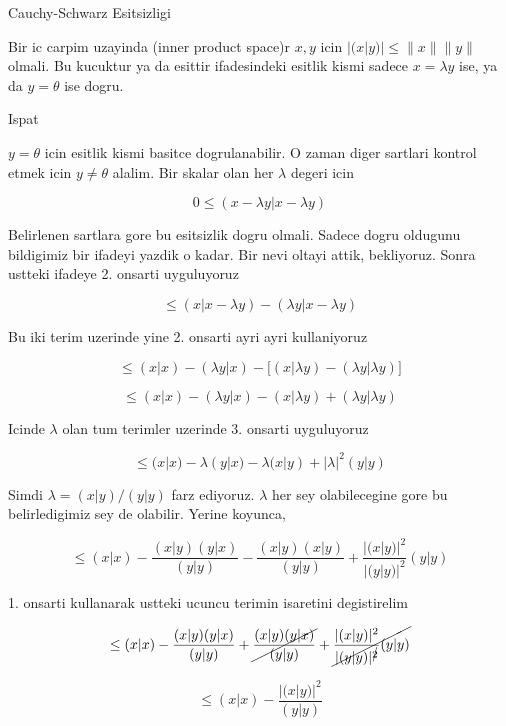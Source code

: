 \documentclass[12pt,fleqn]{article}\usepackage{../common}
\begin{document}
Cauchy-Schwarz Esitsizligi

Bir ic carpim uzayinda (inner product space)r $x,y$ icin $|(x|y)| \le
\|x\|\|y\|$ olmali. 
Bu kucuktur ya da esittir ifadesindeki esitlik kismi sadece $x = \lambda y$
ise, ya da $y = \theta$ ise dogru. 

Ispat

$y = \theta$ icin esitlik kismi basitce dogrulanabilir. O zaman diger
sartlari kontrol etmek icin $y \ne \theta$ alalim. Bir skalar olan her
$\lambda$ degeri icin 

\[ 
0 \le (x-\lambda y | x-\lambda y) 
 \]

Belirlenen sartlara gore bu esitsizlik dogru olmali. Sadece dogru oldugunu
bildigimiz bir ifadeyi yazdik o kadar. Bir nevi oltayi attik, bekliyoruz. 
Sonra ustteki ifadeye 2. onsarti uyguluyoruz

\[ \le (x|x-\lambda y) - (\lambda y| x - \lambda y)\]

Bu iki terim uzerinde yine 2. onsarti ayri ayri kullaniyoruz

\[ 
\le (x|x) - (\lambda y|x) - 
\bigg[ (x|\lambda y) - (\lambda y|\lambda y) \bigg] 
\]

\[ 
\le (x|x) - (\lambda y|x) -  (x|\lambda y) + (\lambda y|\lambda y) 
\]

Icinde $\lambda$ olan tum terimler uzerinde 3. onsarti uyguluyoruz

\[ 
\le
(x|x) - \lambda(y|x) -
\lambda(x|y) + |\lambda|^2 (y|y)
 \]

Simdi $\lambda  = (x|y)/(y|y)$ farz ediyoruz. $\lambda$ her sey olabilecegine gore bu 
belirledigimiz sey de olabilir. Yerine koyunca, 

\[ \le (x|x) - 
\frac{ (x|y)(y|x)}{(y|y)} - 
\frac{ (x|y)(x|y)}{(y|y)} + 
\frac{ |(x|y)|^2}{|(y|y)|^2}(y|y)
 \]

1. onsarti kullanarak ustteki ucuncu terimin isaretini degistirelim

\[ \le (x|x) - 
\frac{ (x|y)(y|x)}{(y|y)} +
\cancel{\frac{ (x|y)(y|x)}{(y|y)}} + 
\cancel{\frac{ |(x|y)|^2}{|(y|y)|^{\cancel{2}}}(y|y)}
 \]

\[ \le (x|x) - 
\frac{ |(x|y)|^2}{(y|y)}
 \]
\end{document}
